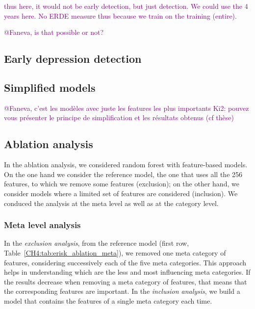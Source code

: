 \documentclass[graybox]{svmult}
\newcommand{\jm}[1]{\textcolor{purple}{{  #1}}}
\begin{document}
\jm{thus here, it would not be early detection, but just detection. We could use the 4 years here. No ERDE measure thus because we train on the training (entire). }

\jm{@Faneva, is that possible or not? }

\subsection{Early depression detection}

\subsection{Simplified models}
\jm{@Faneva, c'est les modèles avec juste les features les plus importants Ki2: pouvez vous présenter le principe de simplification et les résultats obtenus (cf thèse)}

\subsection{Ablation analysis}
In the ablation analysis, we considered random forest  with feature-based models. On the one hand we consider the reference model, the one that uses all the 256 features, to which we remove some features (exclusion); on the other hand, we consider models where a limited set of features  are considered (inclusion). We conduced the analysis at the meta level as well as at the category level.


\subsubsection{Meta level analysis}
In the \textit{exclusion analysis}, from the reference model (first row, Table~\ref{CH4:tab:erisk_ablation_meta}), we removed one meta category of features, considering successively each of the five meta categories. This approach helps in understanding which are the less and most influencing meta categories. If the results decrease when removing a meta category of features, that means that the corresponding features are important. 
In the \textit{inclusion analysis}, we build a model that contains the features of a single meta category each time.
\end{document}
